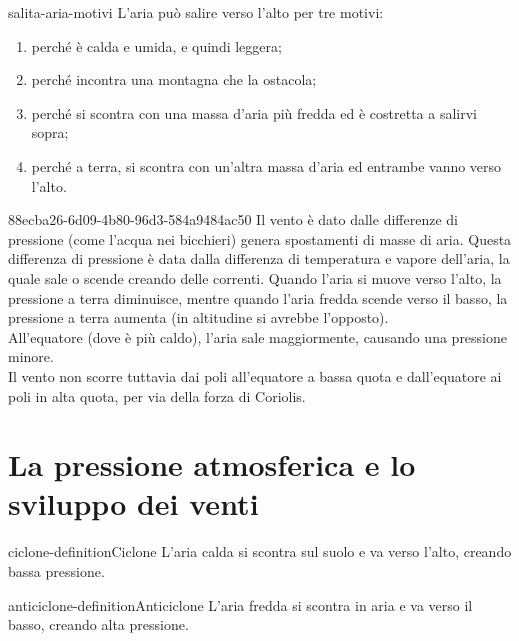 \documentclass[preview]{standalone}
\begin{document}
\begin{snippet}{salita-aria-motivi}
    L'aria può salire verso l'alto per tre motivi:
    \begin{enumerate}
        \item perché è calda e umida, e quindi leggera;
        \item perché incontra una montagna che la ostacola;
        \item perché si scontra con una massa d'aria più fredda ed è costretta a salirvi sopra;
        \item perché a terra, si scontra con un'altra massa d'aria ed entrambe vanno verso l'alto.
    \end{enumerate}
\end{snippet}

\begin{snippet}{88ecba26-6d09-4b80-96d3-584a9484ac50}
    Il vento è dato dalle differenze di pressione (come l'acqua nei bicchieri)
    genera spostamenti di masse di aria.
    Questa differenza di pressione è data dalla differenza di temperatura e vapore dell'aria,
    la quale sale o scende creando delle correnti.
    Quando l'aria si muove verso l'alto, la pressione a terra diminuisce,
    mentre quando l'aria fredda scende verso il basso, la pressione a terra aumenta
    (in altitudine si avrebbe l'opposto).
    \\
    All'equatore (dove è più caldo), l'aria sale maggiormente, causando una pressione minore.
    \\
    Il vento non scorre tuttavia dai poli all'equatore a bassa quota e dall'equatore ai poli in alta quota,
    per via della forza di Coriolis.
\end{snippet}

\section{La pressione atmosferica e lo sviluppo dei venti}

\begin{snippetdefinition}{ciclone-definition}{Ciclone}
    L'aria calda si scontra sul suolo e va verso l'alto, creando bassa pressione.
\end{snippetdefinition}

\begin{snippetdefinition}{anticiclone-definition}{Anticiclone}
    L'aria fredda si scontra in aria e va verso il basso, creando alta pressione.
\end{snippetdefinition}
\end{document}
